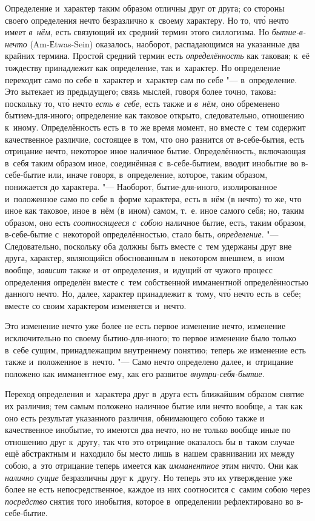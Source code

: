 Определение и~характер таким образом отличны друг от друга; со стороны
своего определения нечто безразлично к~своему характеру. Но то, чт\'{о} нечто
имеет {\em в~нём,} есть связующий их средний термин
этого силлогизма. Но {\em бытие-в-нечто}
(Am-Еtwas-Sein) оказалось, наоборот, распадающимся на указанные два крайних
термина. Простой средний термин есть
{\em определённость} как таковая; к~её тождеству
принадлежит как определение, так и~характер. Но определение переходит само
по себе в~характер и~характер сам по себе "--- в~определение. Это вытекает из
предыдущего; связь мыслей, говоря более точно, такова: поскольку то, чт\'{о}
нечто {\em есть в~себе,} есть также и
{\em в~нём,} оно обременено бытием-для-иного;
определение как таковое открыто, следовательно, отношению к~иному.
Определённость есть в~то же время момент, но вместе с~тем содержит
качественное различие, состоящее в~том, что оно разнится от в-себе-бытия,
есть отрицание нечто, некоторое иное наличное бытие. Определённость,
включающая в~себя таким образом иное, соединённая с~в-себе-бытием, вводит
инобытие во в-себе-бытие или, иначе говоря, в~определение, которое, таким
образом, понижается до характера. "--- Наоборот, бытие-для-иного,
изолированное и~положенное само по себе в~форме характера, есть в~нём (в
нечто) то же, что иное как таковое, иное в~нём (в~ином) самом, т.~е.
иное самого себя; но, таким образом, оно есть
{\em соотносящееся с~собою} наличное бытие, есть, таким
образом, в-себе-бытие с~некоторой определённостью, стало быть,
{\em определение}. "--- Следовательно, поскольку оба
должны быть вместе с~тем удержаны друг вне друга, характер, являющийся
обоснованным в~некотором внешнем, в~ином вообще,
{\em зависит} также и~от определения, и~идущий от
чужого процесс определения определён вместе с~тем собственной имманентной
определённостью данного нечто. Но, далее, характер принадлежит к~тому, чт\'{о}
нечто есть в~себе; вместе со своим характером изменяется и~нечто.

Это изменение нечто уже более не есть первое изменение нечто, изменение
исключительно по своему бытию-для-иного; то первое изменение было только
в~себе сущим, принадлежащим внутреннему понятию; теперь же изменение есть
также и~положенное в~нечто. "--- Само нечто определено далее, и~отрицание
положено как имманентное ему, как его развитое
{\em внутри-себя-бытие}.

Переход определения и~характера друг в~друга есть ближайшим образом снятие
их различия; тем самым положено наличное бытие или нечто вообще, а~так как
оно есть результат указанного различия, обнимающего собою также и
качественное инобытие, то имеются два нечто, но не только вообще иные по
отношению друг к~другу, так что это отрицание оказалось бы в~таком случае
ещё абстрактным и~находило бы место лишь в~нашем сравнивании их между
собою, а~это отрицание теперь имеется как
{\em имманентное} этим ничто. Они как
{\em налично сущие} безразличны друг к~другу. Но теперь
это их утверждение уже более не есть непосредственное, каждое из них
соотносится с~самим собою через {\em посредство} снятия
того инобытия, которое в~определении рефлектировано во в-себе-бытие.

